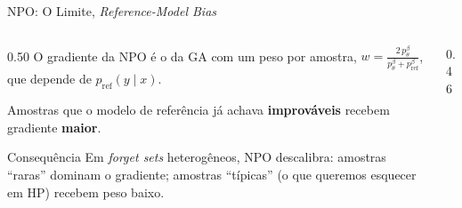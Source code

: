 \documentclass[aspectratio=169,xcolor=dvipsnames]{beamer}
\begin{document}
  \begin{frame}{NPO: O Limite, \textit{Reference-Model Bias}}
    \begin{columns}[T]
      \begin{column}{0.50\textwidth}
        O gradiente da NPO é o da GA com um peso por amostra, $w = \frac{2\,p_\theta^\beta}{p_\theta^\beta + p_{\text{ref}}^\beta}$, que depende de $p_{\text{ref}}(y \mid x)$.

        \vspace{0.2em}
        Amostras que o modelo de referência já achava \textbf{improváveis} recebem gradiente \textbf{maior}.

        \vspace{0.3em}
        \begin{alertblock}{Consequência}
          \footnotesize Em \textit{forget sets} heterogêneos, NPO descalibra: amostras ``raras'' dominam o gradiente; amostras ``típicas'' (o que queremos esquecer em HP) recebem peso baixo.
        \end{alertblock}
      \end{column}
      \begin{column}{0.46\textwidth}
        \centering
      \end{column}
    \end{columns}
  \end{frame}
\end{document}
